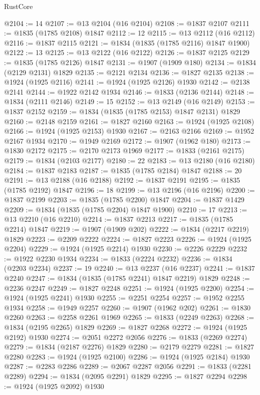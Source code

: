 \begin{lexlean}{RustCore}
\begin{coremodule}
@2104 := 14
@2107 := @13 @2104 (@16 @2104)
@2108 := @1837 @2107
@2111 := @1835 (@1785 @2108) @1847
@2112 := 12
@2115 := @13 @2112 (@16 @2112)
@2116 := @1837 @2115
@2121 := @1834 (@1835 (@1785 @2116) @1847 @1900)
@2122 := 13
@2125 := @13 @2122 (@16 @2122)
@2126 := @1837 @2125
@2129 := @1835 (@1785 @2126) @1847
@2131 := @1907 (@1909 @180)
@2134 := @1834 (@2129 @2131) @1829
@2135 := @2121 @2134
@2136 := @1827 @2135
@2138 := @1924 (@1925 @2116)
@2141 := @1924 (@1925 @2126) @1930
@2142 := @2138 @2141
@2144 := @1922 @2142 @1934
@2146 := @1833 (@2136 @2144)
@2148 := @1834 (@2111 @2146)
@2149 := 15
@2152 := @13 @2149 (@16 @2149)
@2153 := @1837 @2152
@2159 := @1834 (@1835 (@1785 @2153) @1847 @2131) @1829
@2160 := @2148 @2159
@2161 := @1827 @2160
@2163 := @1924 (@1925 @2108)
@2166 := @1924 (@1925 @2153) @1930
@2167 := @2163 @2166
@2169 := @1952 @2167 @1934
@2170 := @1949 @2169
@2172 := @1907 (@1962 @180)
@2173 := @1830 @2172
@2175 := @2170 @2173 @1969
@2177 := @1833 (@2161 @2175)
@2179 := @1834 (@2103 @2177)
@2180 := 22
@2183 := @13 @2180 (@16 @2180)
@2184 := @1837 @2183
@2187 := @1835 (@1785 @2184) @1847
@2188 := 20
@2191 := @13 @2188 (@16 @2188)
@2192 := @1837 @2191
@2195 := @1835 (@1785 @2192) @1847
@2196 := 18
@2199 := @13 @2196 (@16 @2196)
@2200 := @1837 @2199
@2203 := @1835 (@1785 @2200) @1847
@2204 := @1837 @1429
@2209 := @1834 (@1835 (@1785 @2204) @1847 @1900)
@2210 := 17
@2213 := @13 @2210 (@16 @2210)
@2214 := @1837 @2213
@2217 := @1835 (@1785 @2214) @1847
@2219 := @1907 (@1909 @202)
@2222 := @1834 (@2217 @2219) @1829
@2223 := @2209 @2222
@2224 := @1827 @2223
@2226 := @1924 (@1925 @2204)
@2229 := @1924 (@1925 @2214) @1930
@2230 := @2226 @2229
@2232 := @1922 @2230 @1934
@2234 := @1833 (@2224 @2232)
@2236 := @1834 (@2203 @2234)
@2237 := 19
@2240 := @13 @2237 (@16 @2237)
@2241 := @1837 @2240
@2247 := @1834 (@1835 (@1785 @2241) @1847 @2219) @1829
@2248 := @2236 @2247
@2249 := @1827 @2248
@2251 := @1924 (@1925 @2200)
@2254 := @1924 (@1925 @2241) @1930
@2255 := @2251 @2254
@2257 := @1952 @2255 @1934
@2258 := @1949 @2257
@2260 := @1907 (@1962 @202)
@2261 := @1830 @2260
@2263 := @2258 @2261 @1969
@2265 := @1833 (@2249 @2263)
@2268 := @1834 (@2195 @2265) @1829
@2269 := @1827 @2268
@2272 := @1924 (@1925 @2192) @1930
@2274 := @2051 @2272 @2056
@2276 := @1833 (@2269 @2274)
@2279 := @1834 (@2187 @2276) @1829
@2280 := @2179 @2279
@2281 := @1827 @2280
@2283 := @1924 (@1925 @2100)
@2286 := @1924 (@1925 @2184) @1930
@2287 := @2283 @2286
@2289 := @2067 @2287 @2056
@2291 := @1833 (@2281 @2289)
@2294 := @1834 (@2095 @2291) @1829
@2295 := @1827 @2294
@2298 := @1924 (@1925 @2092) @1930

\end{coremodule}
\end{lexlean}

